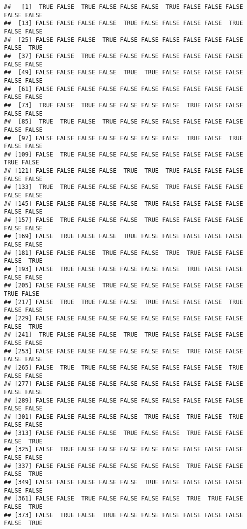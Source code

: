 \documentclass[
]{book}
\begin{document}
\begin{verbatim}
##   [1]  TRUE FALSE  TRUE FALSE FALSE FALSE  TRUE FALSE FALSE FALSE FALSE FALSE
##  [13] FALSE FALSE FALSE FALSE  TRUE FALSE FALSE FALSE FALSE  TRUE FALSE FALSE
##  [25] FALSE FALSE FALSE  TRUE FALSE FALSE FALSE FALSE FALSE FALSE FALSE  TRUE
##  [37] FALSE FALSE  TRUE FALSE FALSE FALSE FALSE FALSE FALSE FALSE FALSE FALSE
##  [49] FALSE FALSE FALSE FALSE  TRUE  TRUE FALSE FALSE FALSE FALSE FALSE FALSE
##  [61] FALSE FALSE FALSE FALSE FALSE FALSE FALSE FALSE FALSE FALSE FALSE FALSE
##  [73]  TRUE FALSE  TRUE FALSE FALSE FALSE FALSE  TRUE FALSE FALSE FALSE FALSE
##  [85]  TRUE  TRUE FALSE  TRUE FALSE FALSE FALSE FALSE FALSE FALSE FALSE FALSE
##  [97] FALSE FALSE FALSE FALSE FALSE FALSE FALSE  TRUE FALSE  TRUE FALSE FALSE
## [109] FALSE  TRUE FALSE FALSE FALSE FALSE FALSE FALSE FALSE FALSE  TRUE FALSE
## [121] FALSE FALSE FALSE FALSE  TRUE  TRUE  TRUE FALSE FALSE FALSE FALSE FALSE
## [133]  TRUE  TRUE FALSE FALSE FALSE FALSE  TRUE FALSE FALSE FALSE FALSE FALSE
## [145] FALSE FALSE FALSE FALSE FALSE  TRUE FALSE FALSE FALSE FALSE FALSE FALSE
## [157] FALSE  TRUE FALSE FALSE FALSE  TRUE FALSE FALSE FALSE FALSE FALSE FALSE
## [169] FALSE  TRUE FALSE FALSE  TRUE FALSE FALSE FALSE FALSE FALSE FALSE FALSE
## [181] FALSE FALSE FALSE  TRUE FALSE FALSE  TRUE  TRUE FALSE FALSE FALSE  TRUE
## [193] FALSE  TRUE FALSE FALSE FALSE FALSE FALSE  TRUE FALSE FALSE FALSE FALSE
## [205] FALSE FALSE FALSE  TRUE FALSE FALSE FALSE FALSE FALSE FALSE  TRUE FALSE
## [217] FALSE  TRUE  TRUE FALSE FALSE  TRUE FALSE FALSE FALSE  TRUE FALSE FALSE
## [229] FALSE FALSE FALSE FALSE FALSE FALSE FALSE FALSE FALSE FALSE FALSE  TRUE
## [241]  TRUE FALSE FALSE FALSE  TRUE  TRUE FALSE FALSE FALSE FALSE FALSE FALSE
## [253] FALSE FALSE FALSE FALSE FALSE FALSE FALSE  TRUE FALSE FALSE FALSE FALSE
## [265] FALSE  TRUE  TRUE FALSE FALSE FALSE FALSE FALSE FALSE  TRUE FALSE FALSE
## [277] FALSE FALSE FALSE FALSE FALSE FALSE FALSE FALSE FALSE FALSE FALSE FALSE
## [289] FALSE FALSE FALSE FALSE FALSE FALSE FALSE FALSE FALSE FALSE FALSE FALSE
## [301] FALSE FALSE FALSE FALSE FALSE  TRUE FALSE  TRUE FALSE  TRUE FALSE FALSE
## [313] FALSE FALSE FALSE FALSE  TRUE FALSE FALSE  TRUE FALSE FALSE FALSE  TRUE
## [325] FALSE  TRUE FALSE FALSE FALSE FALSE FALSE FALSE FALSE FALSE FALSE FALSE
## [337] FALSE FALSE FALSE FALSE FALSE FALSE FALSE  TRUE FALSE FALSE FALSE  TRUE
## [349] FALSE FALSE FALSE FALSE FALSE  TRUE FALSE FALSE FALSE FALSE FALSE FALSE
## [361] FALSE FALSE  TRUE FALSE FALSE FALSE FALSE  TRUE  TRUE FALSE FALSE  TRUE
## [373] FALSE  TRUE FALSE  TRUE FALSE FALSE FALSE FALSE FALSE FALSE FALSE  TRUE

\end{verbatim}
\end{document}
